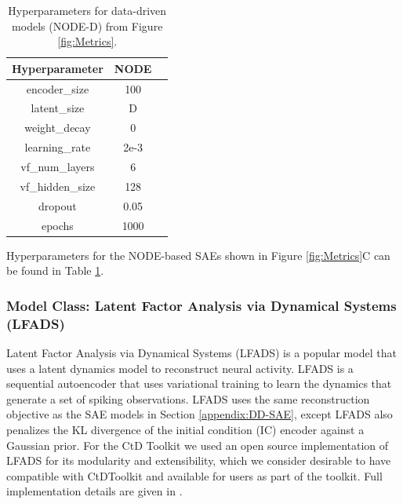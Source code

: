 \documentclass{article}
\begin{document}
\begin{table}[ht]
\centering
\begin{tabular}{|c|c|c|}
\hline
\textbf{Hyperparameter} & \textbf{NODE}  \\ \hline
encoder\_size & 100 \\ \hline
latent\_size & D \\ \hline
weight\_decay & 0  \\ \hline
learning\_rate & 2e-3 \\ \hline
vf\_num\_layers & 6 \\ \hline
vf\_hidden\_size & 128 \\ \hline
dropout & 0.05 \\ \hline
epochs & 1000 \\ \hline
\end{tabular}
\caption{Hyperparameters for data-driven models (NODE-D) from Figure \ref{fig:Metrics}.}
\label{table:DDNODEFig5}
\end{table}

Hyperparameters for the NODE-based SAEs shown in Figure \ref{fig:Metrics}C can be found in Table \ref{table:DDNODEFig5}.

\clearpage
\subsubsection{Model Class: Latent Factor Analysis via Dynamical Systems (LFADS)\label{appendix:DD-LFADS}}
Latent Factor Analysis via Dynamical Systems (LFADS) \cite{pandarinath_inferring_2018} is a popular model that uses a latent dynamics model to reconstruct neural activity. LFADS is a sequential autoencoder that uses variational training to learn the dynamics that generate a set of spiking observations. LFADS uses the same reconstruction objective as the SAE models in Section \ref{appendix:DD-SAE}, except LFADS also penalizes the KL divergence of the initial condition (IC) encoder against a Gaussian prior. For the CtD Toolkit we used an open source implementation of LFADS \cite{lfads-torch} for its modularity and extensibility, which we consider desirable to have compatible with CtDToolkit and available for users as part of the toolkit. Full implementation details are given in \cite{lfads-torch}.
\end{document}
